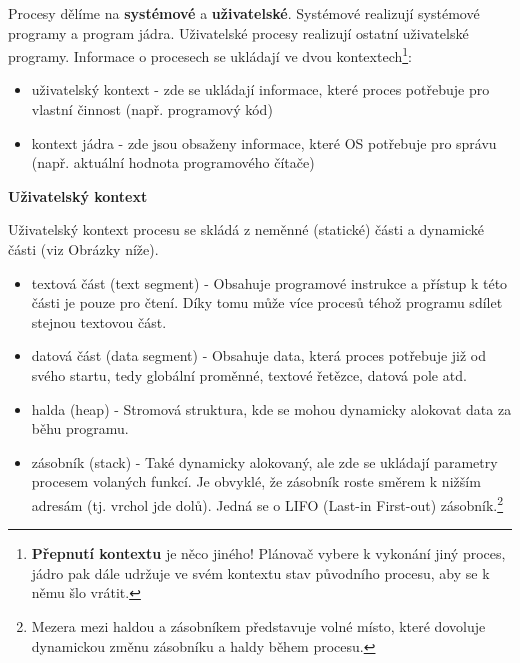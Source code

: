 \vspace{0,5cm}
 
Procesy dělíme na \textbf{systémové} a \textbf{uživatelské}. Systémové realizují systémové programy a program jádra. Uživatelské procesy realizují ostatní uživatelské programy.  Informace o procesech se ukládají ve dvou kontextech\footnote{\textbf{Přepnutí kontextu} je něco jiného! Plánovač vybere k vykonání jiný proces, jádro pak dále udržuje ve svém kontextu stav původního procesu, aby se k němu šlo vrátit.}:

\begin{itemize}
    \item uživatelský kontext - zde se ukládají informace, které proces potřebuje pro vlastní činnost (např. programový kód)
    \item kontext jádra -  zde jsou obsaženy informace, které OS potřebuje pro správu (např. aktuální hodnota programového čítače)
\end{itemize}

\begin{Large}
    \vspace{0,5cm}
    \textbf{Uživatelský kontext}
\end{Large}

Uživatelský kontext procesu se skládá z neměnné (statické) části a dynamické části (viz Obrázky níže).

\begin{itemize}
    \item textová část (text segment) - Obsahuje programové instrukce a přístup k této části je pouze pro čtení. Díky tomu může více procesů téhož programu sdílet stejnou textovou část.
    \item datová část (data segment) - Obsahuje data, která proces potřebuje již od svého startu, tedy globální proměnné, textové řetězce, datová pole atd. 
    \item halda (heap) - Stromová struktura, kde se mohou dynamicky alokovat data za běhu programu.
    \item zásobník (stack) - Také dynamicky alokovaný, ale zde se ukládají parametry procesem volaných funkcí. Je obvyklé, že zásobník roste směrem k nižším adresám (tj. vrchol jde dolů). Jedná se o LIFO (Last-in First-out) zásobník.\footnote{Mezera mezi haldou a zásobníkem představuje volné místo, které dovoluje dynamickou změnu zásobníku a haldy během procesu.} 
\end{itemize}

